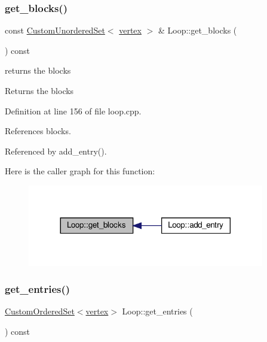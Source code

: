 \subsubsection{\texorpdfstring{get\+\_\+blocks()}{get\_blocks()}}
{\footnotesize\ttfamily const \hyperlink{classCustomUnorderedSet}{Custom\+Unordered\+Set}$<$ \hyperlink{graph_8hpp_abefdcf0544e601805af44eca032cca14}{vertex} $>$ \& Loop\+::get\+\_\+blocks (\begin{DoxyParamCaption}{ }\end{DoxyParamCaption}) const}



returns the blocks 

\begin{DoxyReturn}{Returns}
the blocks 
\end{DoxyReturn}


Definition at line 156 of file loop.\+cpp.



References blocks.



Referenced by add\+\_\+entry().

Here is the caller graph for this function\+:
\nopagebreak
\begin{figure}[H]
\begin{center}
\leavevmode
\includegraphics[width=293pt]{de/d77/classLoop_a2d02ea941387f0fa9efde20f4a812070_icgraph}
\end{center}
\end{figure}
\mbox{\label{classLoop_a37b08e99215e79a65e6d6e07b717eead}} 
\subsubsection{\texorpdfstring{get\+\_\+entries()}{get\_entries()}}
{\footnotesize\ttfamily \hyperlink{classCustomOrderedSet}{Custom\+Ordered\+Set}$<$\hyperlink{graph_8hpp_abefdcf0544e601805af44eca032cca14}{vertex}$>$ Loop\+::get\+\_\+entries (\begin{DoxyParamCaption}{ }\end{DoxyParamCaption}) const\hspace{0.3cm}{\ttfamily [inline]}}



